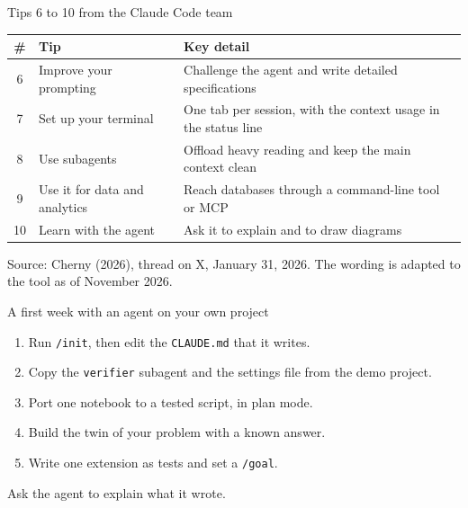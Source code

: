 \documentclass[aspectratio=169,10pt]{beamer}
\newcommand{\emphc}[1]{\textcolor{harvardcrimson}{#1}}
\newcommand{\boristip}[1]{%
  \tikz[baseline=(X.base)]{\node[fill=level4,text=white,
  rounded corners=2pt,inner sep=2pt,font=\tiny\bfseries](X){TIP #1};}}
\begin{document}
\begin{frame}{Tips 6 to 10 from the Claude Code team}
\begin{center}
\renewcommand{\arraystretch}{1.45}
\begin{tabular}{@{}c >{\raggedright\arraybackslash}p{4.8cm} >{\raggedright\arraybackslash}p{7.4cm}@{}}
\toprule
\textbf{\#} & \textbf{Tip} & \textbf{Key detail} \\
\midrule
6 & Improve your \emphc{prompting} & Challenge the agent and write detailed specifications \\
7 & Set up your \emphc{terminal} & One tab per session, with the context usage in the status line \\
8 & Use \emphc{subagents} & Offload heavy reading and keep the main context clean \\
9 & Use it for \emphc{data and analytics} & Reach databases through a command-line tool or MCP \\
10 & \emphc{Learn} with the agent & Ask it to explain and to draw diagrams \\
\bottomrule
\end{tabular}
\end{center}

\vspace{0.6em}
{\scriptsize\textcolor{uzhgreydark}{Source: Cherny (2026), thread on X, January 31, 2026. The wording is adapted to the tool as of November 2026.}}
\end{frame}

\begin{frame}{A first week with an agent on your own project}
\begin{enumerate}\itemsep8pt
  \item Run \texttt{/init}, then edit the \texttt{CLAUDE.md} that it writes.
  \item Copy the \texttt{verifier} subagent and the settings file from the demo project.
  \item Port one notebook to a tested script, in plan mode.
  \item Build the twin of your problem with a known answer.
  \item Write one extension as tests and set a \texttt{/goal}.
\end{enumerate}
\vspace{0.7em}
\boristip{10} Ask the agent to explain what it wrote.
\end{frame}
\end{document}
